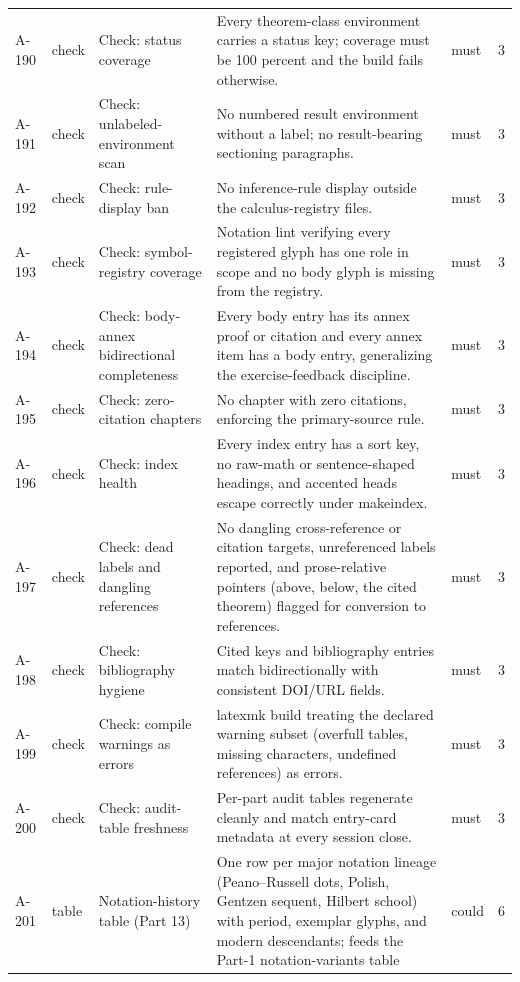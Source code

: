 \begin{longtable}{@{}p{0.45in}p{0.78in}p{2.02in}p{2.6in}p{0.42in}p{0.16in}@{}}
A-190 & check & Check: status coverage & Every theorem-class environment carries a status key; coverage must be 100 percent and the build fails otherwise. & must & 3 \\
A-191 & check & Check: unlabeled-environment scan & No numbered result environment without a label; no result-bearing sectioning paragraphs. & must & 3 \\
A-192 & check & Check: rule-display ban & No inference-rule display outside the calculus-registry files. & must & 3 \\
A-193 & check & Check: symbol-registry coverage & Notation lint verifying every registered glyph has one role in scope and no body glyph is missing from the registry. & must & 3 \\
A-194 & check & Check: body-annex bidirectional completeness & Every body entry has its annex proof or citation and every annex item has a body entry, generalizing the exercise-feedback discipline. & must & 3 \\
A-195 & check & Check: zero-citation chapters & No chapter with zero citations, enforcing the primary-source rule. & must & 3 \\
A-196 & check & Check: index health & Every index entry has a sort key, no raw-math or sentence-shaped headings, and accented heads escape correctly under makeindex. & must & 3 \\
A-197 & check & Check: dead labels and dangling references & No dangling cross-reference or citation targets, unreferenced labels reported, and prose-relative pointers (above, below, the cited theorem) flagged for conversion to references. & must & 3 \\
A-198 & check & Check: bibliography hygiene & Cited keys and bibliography entries match bidirectionally with consistent DOI/URL fields. & must & 3 \\
A-199 & check & Check: compile warnings as errors & latexmk build treating the declared warning subset (overfull tables, missing characters, undefined references) as errors. & must & 3 \\
A-200 & check & Check: audit-table freshness & Per-part audit tables regenerate cleanly and match entry-card metadata at every session close. & must & 3 \\
A-201 & table & Notation-history table (Part 13) & One row per major notation lineage (Peano--Russell dots, Polish, Gentzen sequent, Hilbert school) with period, exemplar glyphs, and modern descendants; feeds the Part-1 notation-variants table & could & 6 \\
\end{longtable}
\endgroup
